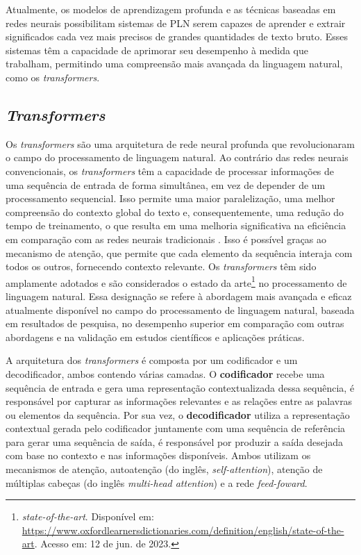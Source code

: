 Atualmente, os modelos de aprendizagem profunda e as técnicas baseadas em redes neurais possibilitam sistemas de PLN serem capazes de aprender e extrair significados cada vez mais precisos de grandes quantidades de texto bruto. Esses sistemas têm a capacidade de aprimorar seu desempenho à medida que trabalham, permitindo uma compreensão mais avançada da linguagem natural, como os \textit{transformers}.

\subsection{\textit{Transformers}}

Os \textit{transformers} são uma arquitetura de rede neural profunda que revolucionaram o campo do processamento de linguagem natural. Ao contrário das redes neurais convencionais, os \textit{transformers} têm a capacidade de processar informações de uma sequência de entrada de forma simultânea, em vez de depender de um processamento sequencial. Isso permite uma maior paralelização, uma melhor compreensão do contexto global do texto e, consequentemente, uma redução do tempo de treinamento, o que resulta em uma melhoria significativa na eficiência em comparação com as redes neurais tradicionais \cite{GoogleTeamTransformers}. Isso é possível graças ao mecanismo de atenção, que permite que cada elemento da sequência interaja com todos os outros, fornecendo contexto relevante. Os \textit{transformers} têm sido amplamente adotados e são considerados o estado da arte\footnote{\textit{state-of-the-art}. Disponível em: \url{https://www.oxfordlearnersdictionaries.com/definition/english/state-of-the-art}. Acesso em: 12 de jun. de 2023.} no processamento de linguagem natural. Essa designação se refere à abordagem mais avançada e eficaz atualmente disponível no campo do processamento de linguagem natural, baseada em resultados de pesquisa, no desempenho superior em comparação com outras abordagens e na validação em estudos científicos e aplicações práticas.

A arquitetura dos \textit{transformers} é composta por um codificador e um decodificador, ambos contendo várias camadas. O \textbf{codificador} recebe uma sequência de entrada e gera uma representação contextualizada dessa sequência, é responsável por capturar as informações relevantes e as relações entre as palavras ou elementos da sequência. Por sua vez, o \textbf{decodificador} utiliza a representação contextual gerada pelo codificador juntamente com uma sequência de referência para gerar uma sequência de saída, é responsável por produzir a saída desejada com base no contexto e nas informações disponíveis. Ambos utilizam os mecanismos de atenção, autoatenção (do inglês, \textit{self-attention}), atenção de múltiplas cabeças (do inglês \textit{multi-head attention}) e a rede \textit{feed-foward}.

